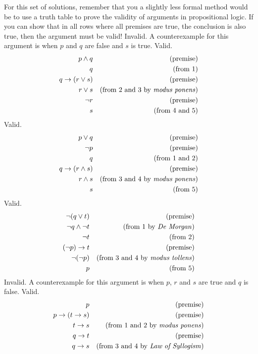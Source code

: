 \begin{solutions}
  \solution
	For this set of solutions, remember that you a slightly less formal method would be to use a truth table to prove the validity of arguments in propositional logic. If you can show that in all rows where all premises are true, the conclusion is also true, then the argument must be valid!
  \spart
    Invalid. A counterexample for this argument is when $p$ and $q$ are false and $s$ is
    true.
    \spart Valid.
    \begin{align}
      p\wedge q && \text{(premise)}\\
      q && \text{(from 1)}\\
      q\rightarrow (r\vee s) && \text{(premise)}\\
      r\vee s && \text{(from 2 and 3 by \textit{modus ponens})}\\
      \lnot r && \text{(premise)}\\
      s && \text{(from 4 and 5)}
    \end{align}
    \spart Valid.
    \setcounter{equation}{0}
    \begin{align}
      p\vee q && \text{(premise)}\\
      \lnot p  && \text{(premise)}\\
      q && \text{(from 1 and 2)}\\
      q\rightarrow (r\wedge s)&&\text{(premise)}\\
      r\wedge s&&\text{(from 3 and 4 by \textit{modus ponens})}\\
      s&&\text{(from 5)}
    \end{align}
    \spart Valid.
    \setcounter{equation}{0}
    \begin{align}
      \lnot(q\vee t)&&\text{(premise)}\\
      \lnot q\wedge\lnot t&&\text{(from 1 by \textit{De Morgan})}\\
      \lnot t&&\text{(from 2)}\\
      (\lnot p)\rightarrow t&&\text{(premise)}\\
      \lnot(\lnot p)&&\text{(from 3 and 4 by \textit{modus tollens})}\\
      p&&\text{(from 5)}
    \end{align}
    \spart Invalid. A counterexample for this argument is when $p$, $r$ and $s$
    are true and $q$ is false.
    \spart Valid.
    \setcounter{equation}{0}
    \begin{align}
      p&&\text{(premise)}\\
      p\rightarrow(t\rightarrow s)&&\text{(premise)}\\
      t\rightarrow s&&\text{(from 1 and 2 by \textit{modus ponens})}\\
      q\rightarrow t&&\text{(premise)}\\
      q\rightarrow s&&\text{(from 3 and 4 by \textit{Law of Syllogism})}
    \end{align}
 

\end{solutions}

